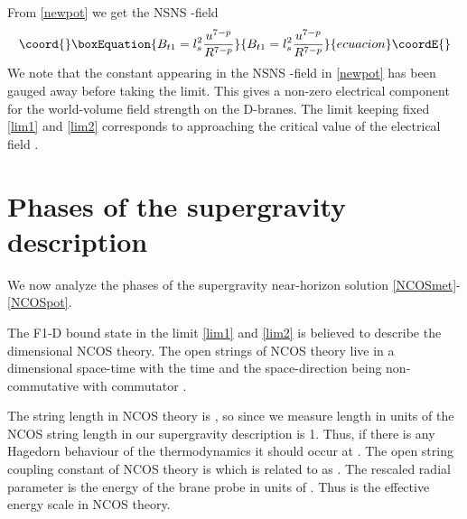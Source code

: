 \documentclass[a4paper,twoside,titlepage,12pt]{article}
\begin{document}
%
From \eqref{newpot} we get the NSNS \coordHE{}-field 
%
\begin{equation}\coord{}\boxEquation{
\label{NCOSpot}
B_{t1} = l_s^2 \frac{u^{7-p}}{R^{7-p}}
}{
B_{t1} = l_s^2 \frac{u^{7-p}}{R^{7-p}}
}{ecuacion}\coordE{}\end{equation}
%
We note that the constant appearing in the NSNS \coordHE{}-field in \eqref{newpot}
has been gauged away before taking the limit.
This gives a non-zero electrical component
for the world-volume field strength \coordHE{} on the D\coordHE{}-branes.
The limit \coordHE{} keeping fixed 
\eqref{lim1} and \eqref{lim2} corresponds to
approaching the critical value of the electrical field \coordHE{}.


\section{Phases of the supergravity description}
\label{secphases}

We now analyze the phases of the supergravity near-horizon solution
\eqref{NCOSmet}-\eqref{NCOSpot}.

The F1-D\coordHE{} bound state in the limit \eqref{lim1} and \eqref{lim2} 
is believed
to describe the \coordHE{} dimensional NCOS theory. 
The open strings of NCOS theory live in a \coordHE{} dimensional space-time with the
time \coordHE{} and the space-direction \coordHE{} being 
non-commutative\cite{Seiberg:2000ms,Gopakumar:2000na} 
with commutator \coordHE{}. 

The string length in NCOS theory 
is \coordHE{} \cite{Seiberg:2000ms,Gopakumar:2000na}, so since 
we measure length
in units of \coordHE{} the NCOS string length in our supergravity 
description is 1.
Thus, if there is any Hagedorn behaviour of the thermodynamics
it should occur at \coordHE{}.
The open string coupling constant of NCOS theory is \coordHE{} which is related
to \coordHE{} as \coordHE{} 
\cite{Gopakumar:2000na}.
The rescaled radial parameter \coordHE{} is the energy of the
brane probe in units of \coordHE{}. Thus \coordHE{} is the 
effective energy scale in NCOS theory.
\end{document}
